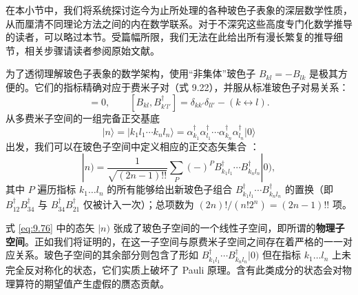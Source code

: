 在本小节中，我们将系统探讨迄今为止所处理的各种玻色子表象的深层数学性质，从而厘清不同理论方法之间的内在数学联系。对于不深究这些高度专门化数学推导的读者，可以略过本节。受篇幅所限，我们无法在此给出所有漫长繁复的推导细节，相关步骤请读者参阅原始文献。

为了透彻理解玻色子表象的数学架构，使用“非集体”玻色子 $B_{kl}=-B_{lk}$ 是极其方便的。它们的指标精确对应于费米子对（式
9.22），并服从标准玻色子对易关系：
\begin{equation}
[B_{kl},B_{k'l'}]=0,\qquad[B_{kl},B^{\dagger}_{k'l'}]=\delta_{kk'}\delta_{ll'}-(k\leftrightarrow l).\label{eq:9.74}
\end{equation}
从多费米子空间的一组完备正交基底
\begin{equation}
|n\rangle=|k_{1}l_{1}\cdots k_{n}l_{n}\rangle=\alpha^{\dagger}_{k_{1}}\alpha^{\dagger}_{l_{1}}\cdots\alpha^{\dagger}_{k_{n}}\alpha^{\dagger}_{l_{n}}|0\rangle\label{eq:9.75}
\end{equation}
出发，我们可以在玻色子空间中定义相应的正交态矢集合 \cite{MYT64a}：
\begin{equation}
|n)=\frac{1}{\sqrt{(2n-1)!!}}\sum_{P}(-)^{P}B^{\dagger}_{k_{1}l_{1}}\cdots B^{\dagger}_{k_{n}l_{n}}|0),\label{eq:9.76}
\end{equation}
其中 $P$ 遍历指标 $k_{1}\ldots l_{n}$ 的所有能够给出新玻色子组合 $B^{\dagger}_{k_{1}l_{1}}\cdots B^{\dagger}_{k_{n}l_{n}}$
的置换（即 $B^{\dagger}_{12}B^{\dagger}_{34}$ 与 $B^{\dagger}_{34}B^{\dagger}_{21}$
仅被计入一次）；总项数为 $(2n)!/(n!2^{n})=(2n-1)!!$ 项。

式 \ref{eq:9.76} 中的态矢 $|n)$ 张成了玻色子空间的一个线性子空间，即所谓的\textbf{物理子空间}。正如我们将证明的，在这一子空间与原费米子空间之间存在着严格的一一对应关系。玻色子空间的其余部分则包含了形如
$B^{\dagger}_{k_{1}l_{1}}\cdots B^{\dagger}_{k_{n}l_{n}}|0)$ 但在指标
$k_{1}\ldots l_{n}$ 上未完全反对称化的状态，它们实质上破坏了 Pauli 原理。含有此类成分的状态会对物理算符的期望值产生虚假的赝态贡献。

